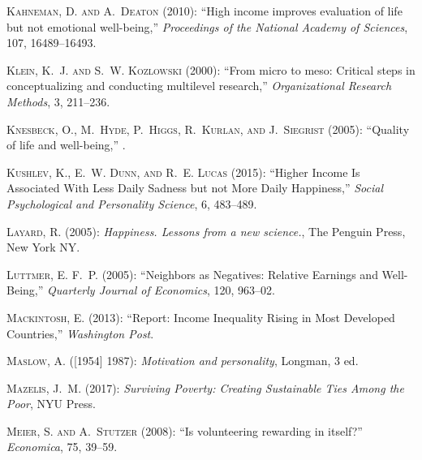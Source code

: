 \documentclass[10pt, letterpaper]{article}
\begin{document}
\begin{spacing}{1.4}
\begin{thebibliography}{71}
\textsc{Kahneman, D. and A.~Deaton} (2010): \enquote{High income improves
  evaluation of life but not emotional well-being,} \emph{Proceedings of the
  National Academy of Sciences}, 107, 16489--16493.

\textsc{Klein, K.~J. and S.~W. Kozlowski} (2000): \enquote{From micro to meso:
  Critical steps in conceptualizing and conducting multilevel research,}
  \emph{Organizational Research Methods}, 3, 211--236.

\textsc{Knesbeck, O., M.~Hyde, P.~Higgs, R.~Kurlan, and J.~Siegrist} (2005):
  \enquote{Quality of life and well-being,} .

\textsc{Kushlev, K., E.~W. Dunn, and R.~E. Lucas} (2015): \enquote{Higher
  Income Is Associated With Less Daily Sadness but not More Daily Happiness,}
  \emph{Social Psychological and Personality Science}, 6, 483--489.

\textsc{Layard, R.} (2005): \emph{Happiness. Lessons from a new science.}, The
  Penguin Press, New York NY.

\textsc{Luttmer, E. F.~P.} (2005): \enquote{Neighbors as Negatives: Relative
  Earnings and Well-Being,} \emph{Quarterly Journal of Economics}, 120,
  963--02.

\textsc{Mackintosh, E.} (2013): \enquote{Report: Income Inequality Rising in
  Most Developed Countries,} \emph{Washington Post}.

\textsc{Maslow, A.} ([1954] 1987): \emph{{Motivation and personality}},
  Longman, 3 ed.

\textsc{Mazelis, J.~M.} (2017): \emph{Surviving Poverty: Creating Sustainable
  Ties Among the Poor}, NYU Press.

\textsc{Meier, S. and A.~Stutzer} (2008{}): \enquote{Is
  volunteering rewarding in itself?} \emph{Economica}, 75, 39--59.


\end{thebibliography}
\end{spacing}
\end{document}
